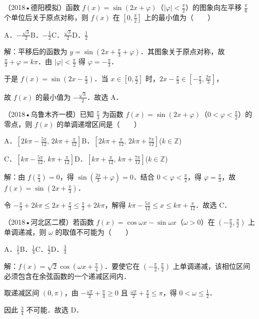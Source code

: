 \begin{question}
（2018•德阳模拟）函数 $f(x)=\sin(2x+\varphi)$（$|\varphi|<\frac{\pi}{2}$）的图象向左平移 $\frac{\pi}{6}$ 个单位后关于原点对称，则 $f(x)$ 在 $[0,\frac{\pi}{2}]$ 上的最小值为（　　）\par
A．$-\frac{\sqrt3}{2}$\qquad B．$-\frac12$\qquad C．$\frac{\sqrt3}{2}$\qquad D．$\frac12$\par
\begin{solution}
解：平移后的函数为 $y=\sin(2x+\frac{\pi}{3}+\varphi)$．其图象关于原点对称，故 $\frac{\pi}{3}+\varphi=k\pi$．由 $|\varphi|<\frac{\pi}{2}$ 得 $\varphi=-\frac{\pi}{3}$．\par
于是 $f(x)=\sin(2x-\frac{\pi}{3})$．当 $x\in[0,\frac{\pi}{2}]$ 时，$2x-\frac{\pi}{3}\in[-\frac{\pi}{3},\frac{2\pi}{3}]$，\par
故 $f(x)$ 的最小值为 $-\frac{\sqrt3}{2}$．故选 A．\par
\end{solution}
\end{question}

\begin{question}
（2018•乌鲁木齐一模）已知 $\frac{\pi}{3}$ 为函数 $f(x)=\sin(2x+\varphi)$（$0<\varphi<\frac{\pi}{2}$）的零点，则 $f(x)$ 的单调递增区间是（　　）\par
A．$[2k\pi-\frac{5\pi}{12},\,2k\pi+\frac{\pi}{12}]$\quad B．$[2k\pi+\frac{\pi}{12},\,2k\pi+\frac{7\pi}{12}]$\quad($k\in\mathbb Z$)\par
C．$[k\pi-\frac{5\pi}{12},\,k\pi+\frac{\pi}{12}]$\quad D．$[k\pi+\frac{\pi}{12},\,k\pi+\frac{7\pi}{12}]$\quad($k\in\mathbb Z$)\par
\begin{solution}
解：由 $f(\frac{\pi}{3})=0$，得 $\sin(\frac{2\pi}{3}+\varphi)=0$．结合 $0<\varphi<\frac{\pi}{2}$，得 $\varphi=\frac{\pi}{3}$，故 $f(x)=\sin(2x+\frac{\pi}{3})$．\par
令 $-\frac{\pi}{2}+2k\pi\leq 2x+\frac{\pi}{3}\leq\frac{\pi}{2}+2k\pi$，解得 $k\pi-\frac{5\pi}{12}\leq x\leq k\pi+\frac{\pi}{12}$．故选 C．\par
\end{solution}
\end{question}

\begin{question}
（2018•河北区二模）若函数 $f(x)=\cos\omega x-\sin\omega x$（$\omega>0$）在 $(-\frac{\pi}{2},\frac{\pi}{2})$ 上单调递减，则 $\omega$ 的取值不可能为（　　）\par
A．$\frac15$\qquad B．$\frac14$\qquad C．$\frac12$\qquad D．$\frac34$\par
\begin{solution}
解：$f(x)=\sqrt2\cos(\omega x+\frac{\pi}{4})$．要使它在 $(-\frac{\pi}{2},\frac{\pi}{2})$ 上单调递减，该相位区间必须包含在余弦函数的一个递减区间内．\par
取递减区间 $(0,\pi)$，由 $-\frac{\omega\pi}{2}+\frac{\pi}{4}\geq0$ 且 $\frac{\omega\pi}{2}+\frac{\pi}{4}\leq\pi$，得 $0<\omega\leq\frac12$．\par
因此 $\frac34$ 不可能．故选 D．\par
\end{solution}
\end{question}

